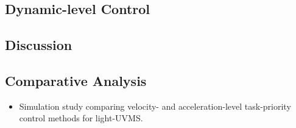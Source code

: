 \subsection{Dynamic-level Control}
\subsection{Discussion}
\subsection{Comparative Analysis}

\begin{itemize}
    \item Simulation study comparing velocity- and acceleration-level task-priority
        control methods for light-UVMS.
\end{itemize}
